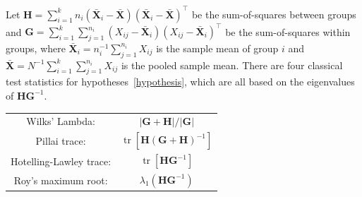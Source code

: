 \documentclass[12pt]{article} %
\DeclareMathOperator{\mytr}{tr}
\newcommand{\bX}{\mathbf{X}}
\newcommand{\bH}{\mathbf{H}}
\newcommand{\bG}{\mathbf{G}}
\theoremstyle{definition}
\begin{document}
Let $\bH=\sum_{i=1}^k n_i (\bar{\bX}_i-\bar{\bX})(\bar{\bX}_i-\bar{\bX})^\top$ be the sum-of-squares between groups and $\bG=\sum_{i=1}^k \sum_{j=1}^{n_i}(X_{ij}-\bar{\bX}_i)(X_{ij}-\bar{\bX}_i)^\top$ be the sum-of-squares within groups, where $\bar{\bX}_i=n_i^{-1}\sum_{j=1}^{n_i}X_{ij}$ is the sample mean of group $i$ and $\bar{\bX}=N^{-1}\sum_{i=1}^k\sum_{j=1}^{n_i}X_{ij}$ is the pooled sample mean.
   There are four classical test statistics for hypotheses~\eqref{hypothesis}, which are all based on the eigenvalues of $\bH\bG^{-1}$. 


       \begin{center}
       \begin{tabular}{|cc|}
           \hline
       {Wilks' Lambda:} & $|\bG+\bH|/|\bG|$\\
       {Pillai trace:} & $\mytr[\bH(\bG+\bH)^{-1}]$\\
       {Hotelling-Lawley trace:} & $\mytr[\bH \bG^{-1}]$\\
       {Roy's maximum root:} & $\lambda_{1}(\bH \bG^{-1})$\\
           \hline
           \end{tabular}
       \end{center}

\end{document}
